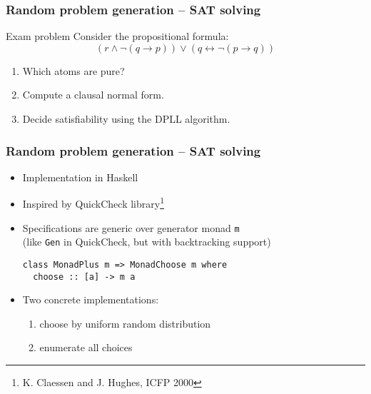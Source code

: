 \documentclass[xcolor={table}]{beamer}
\newcommand{\limpl}{\rightarrow}
\newcommand{\liff}{\leftrightarrow}
\begin{document}


\begin{frame}
    \frametitle{Random problem generation -- SAT solving}

    \begin{block}{Exam problem}
        Consider the propositional formula:
        \[
            (r \land \lnot (q \limpl p)) \lor (q \liff \lnot (p \limpl q))
        \]
        \vspace*{-1.5em}
        \begin{enumerate}
            \item Which atoms are pure?
            \item Compute a clausal normal form.
            \item Decide satisfiability using the DPLL algorithm.
        \end{enumerate}
    \end{block}
\end{frame}


\begin{frame}[fragile]
    \frametitle{Random problem generation -- SAT solving}

    \begin{itemize}
        \item
            Implementation in Haskell
        \item
            Inspired by QuickCheck library\footnote{K. Claessen and J. Hughes, ICFP 2000}
        \item
            Specifications are generic over generator monad \texttt{m}
            \\
            (like \texttt{Gen} in QuickCheck, but with backtracking support)

\begin{lstlisting}
class MonadPlus m => MonadChoose m where
  choose :: [a] -> m a
\end{lstlisting}

        \item
            Two concrete implementations:

            \begin{enumerate}
                \item choose by uniform random distribution
                \item enumerate all choices
            \end{enumerate}
    \end{itemize}
\end{frame}
\end{document}
